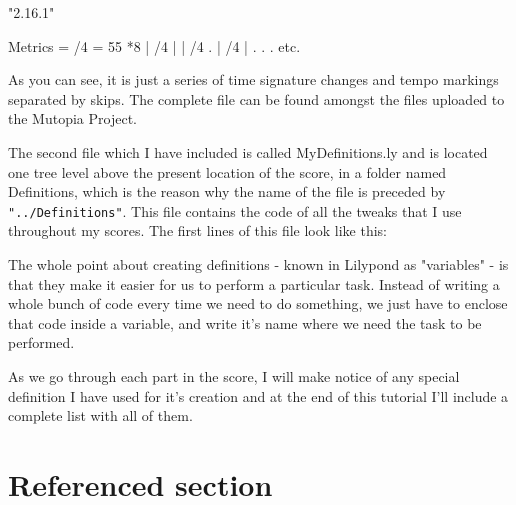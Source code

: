 \documentclass{scrreprt}
\begin{document}
\begin{lilypondcode}
\version "2.16.1"

Metrics = {
  /4  = 55 *8 | %
  /4  | %
   | %
  /4 . | %
  /4  | %
  .
  .
  .
  etc.
}
\end{lilypondcode}

As you can see, it is just a series of time signature changes and tempo markings separated by skips. 
The complete file can be found amongst the files uploaded to the Mutopia Project.

The second file which I have included is called MyDefinitions.ly and is located one tree level above the present location of the score, in a folder named Definitions, which is the reason why the name of the file is preceded by \verb|"../Definitions"|.
This file contains the code of all the tweaks that I use throughout my scores. 
The first lines of this file look like this:


The whole point about creating definitions - known in Lilypond as "variables" - is that they make it easier for us to perform a particular task.
Instead of writing a whole bunch of code every time we need to do something, we just have to enclose that code inside a variable, and write it's name where we need the task to be performed.

As we go through each part in the score, I will make notice of any special definition I have used for it's creation and at the end of this tutorial I'll include a complete list with all of them.

\pagebreak

\section{Referenced section}
\label{sec:ref_sec}
\end{document}

